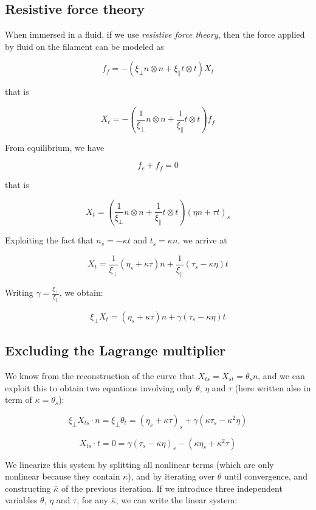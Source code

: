 \documentclass[12pt]{article}
\begin{document}
\subsection{Resistive force theory}
\label{sec:resist-force-theory}



When immersed in a fluid, if we use \emph{resistive force theory},
then the force applied by fluid on the filament can be modeled as

\[f_f = -( \xi_\perp n\otimes n +\xi_\parallel t\otimes t) X_t\]

that is

\[X_t = -\left( \frac{1}{\xi_\perp}  n\otimes n + \frac{1}{\xi_\parallel} t\otimes t\right) f_f\]

From equilibrium, we have

\[f_e+f_f = 0\]

that is

\[X_t = \left( \frac{1}{\xi_\perp}  n\otimes n + \frac{1}{\xi_\parallel} t\otimes t\right) (\eta n + \tau t)_s\]

Exploiting the fact that \(n_s = - \kappa t\) and \(t_s = \kappa n\), we
arrive at

\[X_t =  \frac{1}{\xi_\perp} (\eta_s + \kappa \tau) n + \frac{1}{\xi_\parallel}(\tau_s - \kappa \eta) t\]

Writing $\gamma = \frac{\xi_\perp}{\xi_\parallel}$, we obtain:

\[\xi_\perp X_t =   (\eta_s + \kappa \tau) n + \gamma (\tau_s - \kappa \eta) t\]

\subsection{Excluding the Lagrange multiplier}\label{differential-derivation}

We know from the reconstruction of the curve that
\(X_{ts} = X_{st} = \theta_s n\),
and we can exploit this to obtain two equations involving only
\(\theta\),
\(\eta\)
and \(\tau\) (here written also in term of $\kappa = \theta_s$):

\[ \xi_\perp X_{ts}\cdot n =\xi_\perp \theta_t =   (\eta_s + \kappa \tau)_s + \gamma (\kappa \tau_s - \kappa^2 \eta)\]

\[X_{ts}\cdot t = 0 =  \gamma(\tau_s - \kappa \eta)_s - (\kappa \eta_s + \kappa^2 \tau) \]

We linearize this system by splitting all nonlinear terms (which are
only nonlinear because they contain \(\kappa\)), and by iterating over
\(\theta\) until convergence, and constructing \(\bar\kappa\) of the
previous iteration. If we introduce three independent variables
\(\theta\), \(\eta\) and \(\tau\), for any \(\bar\kappa\), we can write
the linear system:
\end{document}
